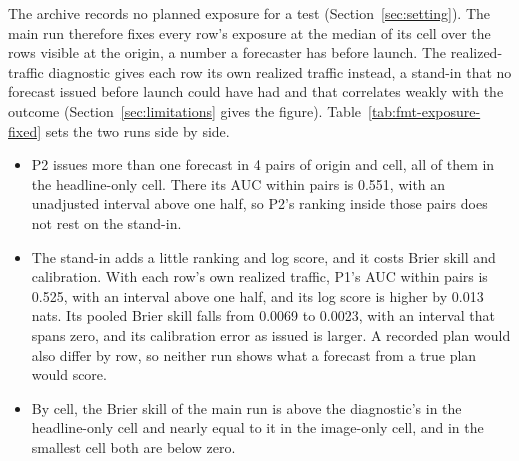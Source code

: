 The archive records no planned exposure for a test (Section~\ref{sec:setting}). The main run therefore fixes every row's exposure at the median of its cell over the rows visible at the origin, a number a forecaster has before launch. The realized-traffic diagnostic gives each row its own realized traffic instead, a stand-in that no forecast issued before launch could have had and that correlates weakly with the outcome (Section~\ref{sec:limitations} gives the figure). Table~\ref{tab:fmt-exposure-fixed} sets the two runs side by side.
\begin{itemize}
\item P2 issues more than one forecast in 4 pairs of origin and cell, all of them in the headline-only cell. There its AUC within pairs is 0.551, with an unadjusted interval above one half, so P2's ranking inside those pairs does not rest on the stand-in.
\item The stand-in adds a little ranking and log score, and it costs Brier skill and calibration. With each row's own realized traffic, P1's AUC within pairs is 0.525, with an interval above one half, and its log score is higher by 0.013 nats. Its pooled Brier skill falls from 0.0069 to 0.0023, with an interval that spans zero, and its calibration error as issued is larger. A recorded plan would also differ by row, so neither run shows what a forecast from a true plan would score.
\item By cell, the Brier skill of the main run is above the diagnostic's in the headline-only cell and nearly equal to it in the image-only cell, and in the smallest cell both are below zero.
\end{itemize}

